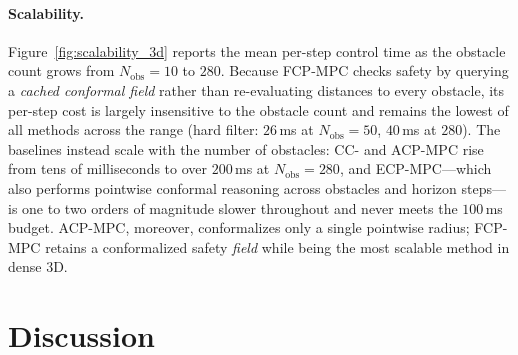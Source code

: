 \documentclass[lettersize,journal]{IEEEtran}
\begin{document}
\begin{table}[!t]
\centering
\small
\caption{3D quadrotor navigation at a lower obstacle count ($N_{\mathrm{obs}}=50$),
reported as mean $\pm$ std over $17$ seeds ($\alpha=0.10$); same setup and columns as
Table~\ref{tab:pybullet_results}. Reporting both densities shows how each method behaves
as the workspace becomes less cluttered.}
\label{tab:results_sparse}

\end{table}

\paragraph{Scalability.}
Figure~\ref{fig:scalability_3d} reports the mean per-step control time as the obstacle
count grows from $N_{\mathrm{obs}}=10$ to $280$.
Because FCP-MPC checks safety by querying a \emph{cached conformal field} rather than
re-evaluating distances to every obstacle, its per-step cost is largely insensitive to
the obstacle count and remains the lowest of all methods across the range (hard filter:
$26$\,ms at $N_{\mathrm{obs}}=50$, $40$\,ms at $280$).
The baselines instead scale with the number of obstacles: CC- and ACP-MPC rise from tens
of milliseconds to over $200$\,ms at $N_{\mathrm{obs}}=280$, and ECP-MPC---which also
performs pointwise conformal reasoning across obstacles and horizon steps---is one to two
orders of magnitude slower throughout and never meets the $100$\,ms budget.
ACP-MPC, moreover, conformalizes only a single pointwise radius; FCP-MPC retains a
conformalized safety \emph{field} while being the most scalable method in dense 3D.





\section{Discussion}
\label{sec:discussion}
\end{document}
